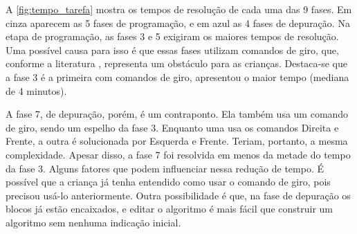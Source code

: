 A \autoref{fig:tempo_tarefa} mostra os tempos de resolução de cada uma das 9 fases. Em cinza aparecem as 5 fases de programação, e em azul as 4 fases de depuração. Na etapa de programação, as fases 3 e 5 exigiram os maiores tempos de resolução. Uma possível causa para isso é que essas fases utilizam comandos de giro, que, conforme a literatura \cite{piaget_development_1964},  representa um obstáculo para as crianças. Destaca-se que a fase 3 é a primeira com comandos de giro, apresentou o maior tempo (mediana de 4 minutos).

A fase 7, de depuração, porém, é um contraponto. Ela também usa um comando de giro, sendo um espelho da fase 3. Enquanto uma usa os comandos Direita e Frente, a outra é solucionada por Esquerda e Frente. Teriam, portanto, a mesma complexidade. Apesar disso, a fase 7 foi resolvida em menos da metade do tempo da fase 3. Alguns fatores que podem influenciar nessa redução de tempo. É possível que a criança já tenha entendido como usar o comando de giro, pois precisou usá-lo anteriormente. Outra possibilidade é que, na fase de depuração os blocos já estão encaixados, e editar o algoritmo é mais fácil que construir um algoritmo sem nenhuma indicação inicial. 







